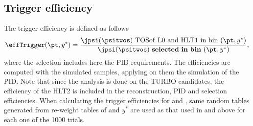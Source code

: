 \subsection{Trigger efficiency}
The trigger efficiency is defined as follows
\begin{equation}
    \effTrigger(\pt,y^*)=\frac{\jpsi(\psitwos)\mathrm{ \ TOS of \ L0 \ and \ HLT1 \ in \ bin \ }(\pt,y^*)}{\jpsi(\psitwos)\mathbf{ \ selected \ in \ bin \ }(\pt,y^*)},
\end{equation}
where the selection includes here the PID requirements. The efficiencies are computed with the simulated samples, applying on them the simulation of the PID. Note that since the analysis is done on the TURBO candidates, the efficiency of the HLT2 is included in the reconstruction, PID and selection efficiencies. When calculating the trigger efficiencies for \jpsi and \psitwos, same random tables generated from re-weight tables of \pt and $y^*$ are used as that used in \effReco and \effID above for each one of the 1000 trials.

